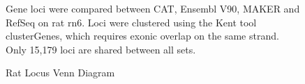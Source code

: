 \documentclass[fleqn,10pt]{wlscirep}
\begin{document}
\begin{figure}
\centering
{}
\caption{Rat Locus Venn Diagram}
Gene loci were compared between CAT, Ensembl V90, MAKER and RefSeq on rat rn6. Loci were clustered using the Kent tool clusterGenes, which requires exonic overlap on the same strand. Only 15,179 loci are shared between all sets.
\label{supp_fig:rat_locus_venn}
\end{figure}
\end{document}
